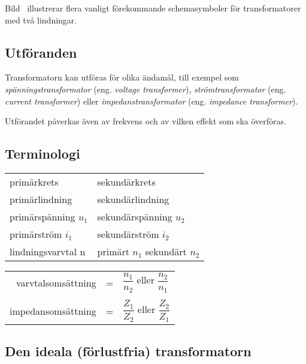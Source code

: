 Bild~ illustrerar flera vanligt förekommande schemasymboler
för transformatorer med två lindningar.

\subsection{Utföranden}

Transformatorn kan utföras för olika ändamål, till exempel som
\emph{spänningstransformator} (eng. \emph{voltage transformer}),
\emph{strömtransformator} (eng. \emph{current transformer}) eller
\emph{impedanstransformator} (eng. \emph{impedance transformer}).

Utförandet påverkas även av frekvens och av vilken effekt som ska överföras.

\subsection{Terminologi}

\begin{center}
\begin{tabular}{ll}
primärkrets & sekundärkrets \\
primärlindning & sekundärlindning \\
primärspänning \(u_1\) &  sekundärspänning \(u_2\) \\
primärström \(i_1\) & sekundärström \(i_2\) \\
lindningsvarvtal n & primärt \(n_1\) sekundärt \(n_2\)
\end{tabular}
\end{center}

\begin{tabular}{rcl}
varvtalsomsättning &=& \(\dfrac{n_1}{n_2}\) eller \(\dfrac{n_2}{n_1}\) \\
&&\\
impedansomsättning &=& \(\dfrac{Z_1}{Z_2}\) eller \(\dfrac{Z_2}{Z_1}\) \\
\end{tabular}

\subsection{Den ideala (förlustfria) transformatorn}
\label{ideal_transformator}

